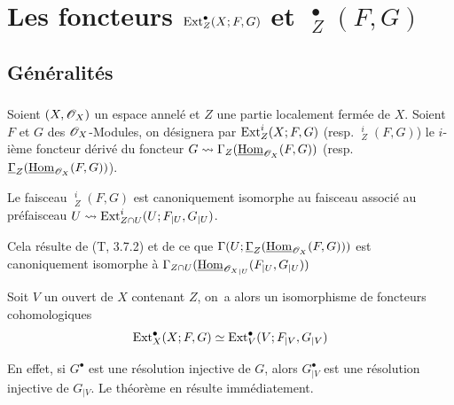 \chapter{Les foncteurs $\operatorname{Ext}^{\bullet}_Z(X;F, G)$ et $\mathop{\underline{\mathrm{Ext}}}\nolimits^{\bullet}_Z(F, G)$} \label{VI}

\makeatletter{}\makeatother{}

\section{G\'en\'eralit\'es} \label{VI.1}
\enlargethispage{\baselineskip}%
\subsection{} \label{VI.1.1}
Soient $(X, \mathscr{O}_X)$ un espace annel\'e et $Z$ une partie localement ferm\'ee de $X$. Soient $F$ et $G$ des $\mathscr{O}_X$-Modules, on d\'esignera par ${\operatorname{Ext}_Z^i}(X;F, G)$ (resp. ${\mathop{\underline{\mathrm{Ext}}}\nolimits_Z^i}(F, G)$) le $i$-i\`eme foncteur d\'eriv\'e du foncteur $G \rightsquigarrow \Gamma_Z(\mathop{\underline{\mathrm{Hom}}}\nolimits_{\mathscr{O}_X}(F, G))$ (resp. $\underline{\Gamma}_Z(\mathop{\underline{\mathrm{Hom}}}\nolimits_{\mathscr{O}_X}(F, G))$).

\begin{lemme} \label{VI.1.2}
Le faisceau ${\mathop{\underline{\mathrm{Ext}}}\nolimits_Z^i}(F, G)$ est canoniquement isomorphe au faisceau associ\'e au pr\'efaisceau $U\rightsquigarrow {\operatorname{Ext}_{Z\cap U}^i}(U;F_{|U}, G_{|U})$.
\end{lemme}

Cela r\'esulte de (T, 3.7.2) et de ce que $\Gamma(U;\underline{\Gamma}_Z(\mathop{\underline{\mathrm{Hom}}}\nolimits_{\mathscr{O}_X}(F, G)))$ est canoniquement isomorphe \`a $\Gamma_{Z\cap U}(\mathop{\underline{\mathrm{Hom}}}\nolimits_{{\mathscr{O}_X}_{|U}}(F_{|U}, G_{|U}))$

\begin{theoreme} \label{VI.1.3}
Soit $V$ un ouvert de $X$ contenant $Z$, on~a alors un isomorphisme de foncteurs cohomologiques
\begin{equation} \label{VI.1.3.1}
\operatorname{Ext}_{X}^{\bullet}(X;F, G) \simeq \operatorname{Ext}_{V}^{\bullet}(V;F_{|V}, G_{|V})
\end{equation}
\end{theoreme}

En effet, si $G^\bullet$ est une r\'esolution injective de $G$, alors $G^\bullet_{|V}$ est une r\'esolution injective de $G_{|V}$. Le th\'eor\`eme en r\'esulte imm\'ediatement.

